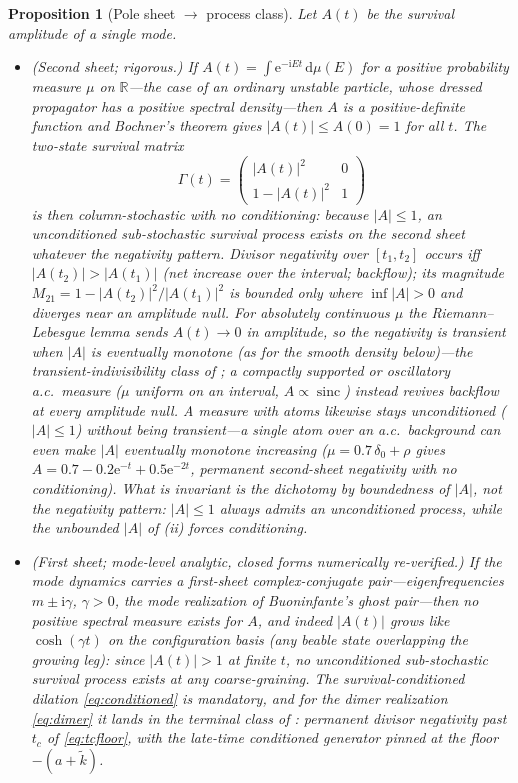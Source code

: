 \documentclass[11pt]{article}
\newtheorem{proposition}[theorem]{Proposition}
\theoremstyle{definition}
\theoremstyle{remark}
\newcommand{\ii}{\mathrm{i}}
\newcommand{\ee}{\mathrm{e}}
\newcommand{\dd}{\mathrm{d}}
\newcommand{\wt}{\widetilde{k}}
\begin{document}
\begin{proposition}[Pole sheet $\to$ process class]
\label{prop:bochner}
Let $A(t)$ be the survival amplitude of a single mode.
\begin{itemize}
\item[(i)] (Second sheet; rigorous.) If
$A(t)=\int\ee^{-\ii Et}\,\dd\mu(E)$ for a positive probability
measure $\mu$ on $\mathbb{R}$---the case of an ordinary unstable
particle, whose dressed propagator has a positive spectral
density---then $A$ is a positive-definite function and Bochner's
theorem gives $|A(t)|\le A(0)=1$ for all $t$. The two-state survival
matrix
\[
\Gamma(t)=\begin{pmatrix}|A(t)|^{2}&0\\ 1-|A(t)|^{2}&1\end{pmatrix}
\]
is then column-stochastic with \emph{no conditioning}: because
$|A|\le1$, an unconditioned sub-stochastic survival process exists on the
second sheet whatever the negativity pattern. Divisor negativity over
$[t_{1},t_{2}]$ occurs iff $|A(t_{2})|>|A(t_{1})|$ (net increase over the
interval; backflow); its
magnitude $M_{21}=1-|A(t_{2})|^{2}/|A(t_{1})|^{2}$ is bounded only where
$\inf|A|>0$ and diverges near an amplitude null. For absolutely continuous
$\mu$ the Riemann--Lebesgue lemma sends $A(t)\to0$ in amplitude, so the
negativity is transient \emph{when $|A|$ is eventually monotone} (as for
the smooth density below)---the transient-indivisibility class of
\cite{indivisible}; a compactly supported or oscillatory a.c.\ measure
($\mu$ uniform on an interval, $A\propto\operatorname{sinc}$) instead
revives backflow at every amplitude null. A measure with atoms likewise
stays unconditioned ($|A|\le1$) without being transient---a single atom
over an a.c.\ background can even make $|A|$ eventually monotone
\emph{increasing} ($\mu=0.7\,\delta_{0}+\rho$ gives
$A=0.7-0.2\ee^{-t}+0.5\ee^{-2t}$, permanent second-sheet negativity with
no conditioning). What is invariant is the dichotomy by \emph{boundedness
of $|A|$}, not the negativity pattern: $|A|\le1$ always admits an
unconditioned process, while the unbounded $|A|$ of (ii) forces
conditioning.
\item[(ii)] (First sheet; mode-level analytic, closed forms
numerically re-verified.) If the mode dynamics carries a first-sheet
complex-conjugate pair---eigenfrequencies $m\pm\ii\gamma$,
$\gamma>0$, the mode realization of Buoninfante's ghost
pair---then no positive spectral measure exists for $A$, and indeed
$|A(t)|$ grows like $\cosh(\gamma t)$ on the configuration basis (any
beable state overlapping the growing leg): since $|A(t)|>1$ at finite
$t$, \emph{no} unconditioned sub-stochastic survival process exists
at any coarse-graining. The survival-conditioned dilation
\eqref{eq:conditioned} is mandatory, and for the dimer realization
\eqref{eq:dimer} it lands in the terminal class of
\cite{indivisible}: permanent divisor negativity past
$t_{c}$ of \eqref{eq:tcfloor}, with the late-time conditioned
generator pinned at the floor $-(a+\wt)$.
\end{itemize}
\end{proposition}
\end{document}
